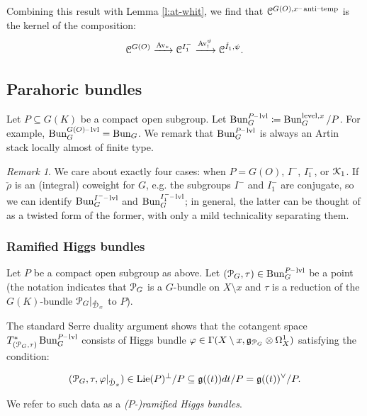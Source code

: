 \documentclass[reqno,11pt]{amsart}
\numberwithin{equation}{subsection}
\theoremstyle{remark}
\newtheorem{rem}[thm]{Remark}
\newcommand{\xar}[1]{\xrightarrow{#1}}
\newcommand{\sC}{{\EuScript C}}
\newcommand{\sD}{{\EuScript D}}
\newcommand{\sK}{{\EuScript K}}
\newcommand{\sP}{{\EuScript P}}
\newcommand{\fg}{{\mathfrak g}}
\newcommand{\on}{\operatorname}
\newcommand{\mathendash}{\text{\textendash}}
\newcommand{\vph}{\varphi}
\newcommand{\Bun}{\on{Bun}}
\newcommand{\Av}{\on{Av}}
\newcommand{\Lie}{\on{Lie}}
\renewcommand{\o}[1]{\mathring{#1}}
\renewcommand{\subset}{\subseteq}
\newcommand{\xat}{x\mathendash\on{anti}\!\mathendash\!\on{temp}}
\newcommand{\level}{\mathendash\on{lvl}}
\begin{document}
Combining this result with Lemma \ref{l:at-whit}, we find that
$\sC^{G(O),\xat}$ is the kernel of the composition:
%
\begin{equation}\label{eq:at-ker}
\sC^{G(O)} \xar{\Av_*} \sC^{I_1^-} \xar{\Av_!^{\psi}} \sC^{\o{I}_1,\psi}.
\end{equation}

\subsection{Parahoric bundles}

Let $P \subset G(K)$ be a compact open subgroup. Let
$\Bun_G^{P\level} \coloneqq \Bun_G^{\on{level},x}/P$. For example,
$\Bun_G^{G(O)\level} = \Bun_G$. We remark that $\Bun_G^{P\level}$ is always
an Artin stack locally almost of finite type.

\begin{rem}

We care about exactly four cases: when $P = G(O)$, $I^-$, $I_1^-$,
or $\sK_1$. If $\check{\rho}$ is an (integral) coweight for $G$, e.g. the subgroups
$I^-$ and $I_1^-$ are conjugate, so we can identify
$\Bun_G^{I^-\level}$ and $\Bun_G^{I_1^-\level}$; in general, the latter
can be thought of as a twisted form of the former, with only a mild technicality
separating them.

\end{rem}

\subsubsection{Ramified Higgs bundles}

Let $P$ be a compact open subgroup as above.
Let $(\sP_G,\tau) \in \Bun_G^{P\level}$ be a point (the notation indicates
that $\sP_G$ is a $G$-bundle on $X \setminus x$ and $\tau$ is a reduction 
of the $G(K)$-bundle $\sP_G|_{\o{\sD}_x}$ to $P$).

The standard Serre duality argument shows that the cotangent space
$T_{(\sP_G,\tau)}^* \Bun_G^{P\level}$ consists of Higgs bundle
$\vph \in \Gamma(X\setminus x,\fg_{\sP_G} \otimes \Omega_X^1)$
satisfying the condition: 

\[
(\sP_G,\tau,\vph|_{\o{\sD}_x}) 
\in \Lie(P)^{\perp}/P \subset \fg((t))dt/P = \fg((t))^{\vee}/P.
\]

\noindent We refer to such data as a \emph{($P$-)ramified Higgs bundles}.

\subsubsection{}\label{sss:ram-irreg}
\end{document}
